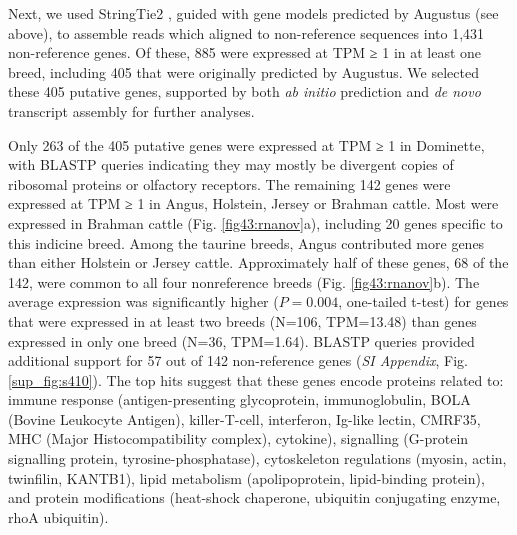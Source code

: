 \documentclass[../main.tex]{subfiles}
\begin{document}
Next, we used StringTie2 \citep{kovaka2019transcriptome}, guided with gene models predicted by Augustus (see above), to assemble reads which aligned to non-reference sequences into 1,431 non-reference genes. Of these, 885 were expressed at TPM ≥ 1 in at least one breed, including 405 that were originally predicted by Augustus. We selected these 405 putative genes, supported by both \emph{ab initio} prediction and \emph{de novo} transcript assembly for further analyses. 

Only 263 of the 405 putative genes were expressed at TPM ≥ 1 in Dominette, with BLASTP queries indicating they may mostly be divergent copies of ribosomal proteins or olfactory receptors. The remaining 142 genes were expressed at TPM ≥ 1 in Angus, Holstein, Jersey or Brahman cattle. Most were expressed in Brahman cattle (Fig. \ref{fig43:rnanov}a), including 20 genes specific to this indicine breed. Among the taurine breeds, Angus contributed more genes than either Holstein or Jersey cattle. Approximately half of these genes, 68 of the 142, were common to all four nonreference breeds (Fig. \ref{fig43:rnanov}b). The average expression was significantly higher ($P=0.004$, one-tailed t-test) for genes that were expressed in at least two breeds (N=106, TPM=13.48) than genes expressed in only one breed (N=36, TPM=1.64). BLASTP queries provided additional support for 57 out of 142 non-reference genes (\emph{SI Appendix}, Fig. \ref{sup_fig:s410}). The top hits suggest that these genes encode proteins related to: immune response (antigen-presenting glycoprotein, immunoglobulin, BOLA (Bovine Leukocyte Antigen), killer-T-cell, interferon, Ig-like lectin, CMRF35, MHC (Major Histocompatibility complex), cytokine), signalling (G-protein signalling protein, tyrosine-phosphatase), cytoskeleton regulations (myosin, actin, twinfilin, KANTB1), lipid metabolism (apolipoprotein, lipid-binding protein), and protein modifications (heat-shock chaperone, ubiquitin conjugating enzyme, rhoA ubiquitin). 
\end{document}
